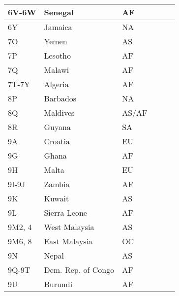 \documentclass[a4paper]{article}
\begin{document}
\begin{longtable}{|p{1.5cm}|p{4cm}|l|p{2cm}|p{2cm}|p{2cm}|}
\hline
6V-6W                  & Senegal                                    & AF    & & & \\
\hline
6Y                     & Jamaica                                    & NA    & & & \\
\hline
7O                     & Yemen                                      & AS    & & & \\
\hline
7P                     & Lesotho                                    & AF    & & & \\
\hline
7Q                     & Malawi                                     & AF    & & & \\
\hline
7T-7Y                  & Algeria                                    & AF    & & & \\
\hline
8P                     & Barbados                                   & NA    & & & \\
\hline
8Q                     & Maldives                                   & AS/AF & & & \\
\hline
8R                     & Guyana                                     & SA    & & & \\
\hline
9A                     & Croatia                                    & EU    & & & \\
\hline
9G                     & Ghana                                      & AF    & & & \\
\hline
9H                     & Malta                                      & EU    & & & \\
\hline
9I-9J                  & Zambia                                     & AF    & & & \\
\hline
9K                     & Kuwait                                     & AS    & & & \\
\hline
9L                     & Sierra Leone                               & AF    & & & \\
\hline
9M2, 4                 & West Malaysia                              & AS    & & & \\
\hline
9M6, 8                 & East Malaysia                              & OC    & & & \\
\hline
9N                     & Nepal                                      & AS    & & & \\
\hline
9Q-9T                  & Dem. Rep. of Congo                         & AF    & & & \\
\hline
9U                     & Burundi                                    & AF    & & & \\

\end{longtable}
\end{document}
